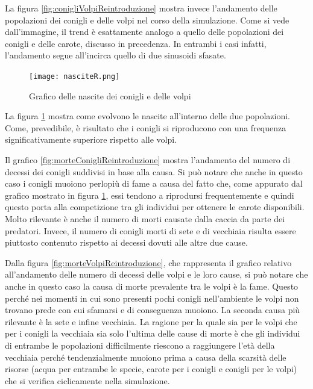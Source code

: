 \documentclass[11pt]{article}
\begin{document}
La figura \ref{fig:conigliVolpiReintroduzione} mostra invece l'andamento delle popolazioni dei conigli e delle volpi nel corso della simulazione. Come si vede dall'immagine, il trend è esattamente analogo a quello delle popolazioni dei conigli e delle carote, discusso in precedenza. In entrambi i casi infatti, l'andamento segue all'incirca quello di due sinusoidi sfasate. 


\begin{figure}[h!]
     \centering
     \texttt{[image: nasciteR.png]}
     \caption{Grafico delle nascite dei conigli e delle volpi}
     \label{fig:nasciteReintroduzione}
\end{figure}

La figura \ref{fig:nasciteReintroduzione} mostra come evolvono le nascite all'interno delle due popolazioni. Come, prevedibile, è risultato che i conigli si riproducono con una frequenza significativamente superiore rispetto alle volpi. 

Il grafico \ref{fig:morteConigliReintroduzione} mostra l'andamento del numero di decessi dei conigli suddivisi in base alla causa. Si può notare che anche in questo caso i conigli muoiono perlopiù di fame a causa del fatto che, come appurato dal grafico mostrato in figura \ref{fig:nasciteReintroduzione}, essi tendono a riprodursi frequentemente e quindi questo porta alla competizione tra gli individui per ottenere le carote disponibili. Molto rilevante è anche il numero di morti causate dalla caccia da parte dei predatori. Invece, il numero di conigli morti di sete e di vecchiaia risulta essere piuttosto contenuto rispetto ai decessi dovuti alle altre due cause. 

Dalla figura \ref{fig:morteVolpiReintroduzione}, che rappresenta il grafico relativo all'andamento delle numero di decessi delle volpi e le loro cause, si può notare che anche in questo caso la causa di morte prevalente tra le volpi è la fame. Questo perché nei momenti in cui sono presenti pochi conigli nell'ambiente le volpi non trovano prede con cui sfamarsi e di conseguenza muoiono. La seconda causa più rilevante è la sete e infine vecchiaia. La ragione per la quale sia per le volpi che per i conigli la vecchiaia sia solo l'ultima delle cause di morte è che gli individui di entrambe le popolazioni difficilmente riescono a raggiungere l'età della vecchiaia perché tendenzialmente muoiono prima a causa della scarsità delle risorse (acqua per entrambe le specie, carote per i conigli e conigli per le volpi) che si verifica ciclicamente nella simulazione. 
\end{document}
